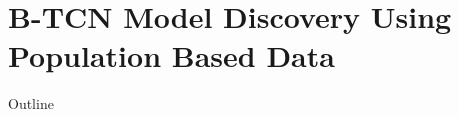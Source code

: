 \documentclass[8pt,xcolor=dvipsnames,compress]{beamer}
\begin{document}
%
\section{B-TCN Model Discovery Using Population Based Data}
\begin{frame}{Outline}
\end{frame}



\end{document}
